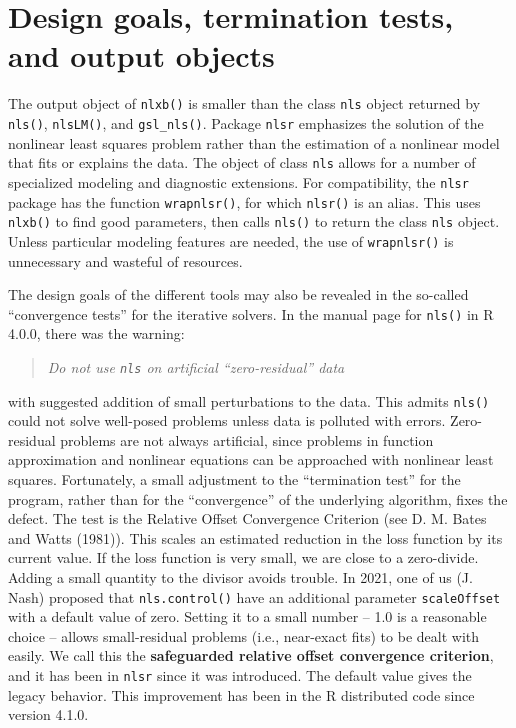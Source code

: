 \hypertarget{design-goals-termination-tests-and-output-objects}{%
\section{Design goals, termination tests, and output objects}\label{design-goals-termination-tests-and-output-objects}}

The output object of \texttt{nlxb()} is smaller than the class \texttt{nls} object returned
by \texttt{nls()}, \texttt{nlsLM()}, and \texttt{gsl\_nls()}. Package \texttt{nlsr} emphasizes the solution
of the nonlinear least squares problem rather than the estimation of a nonlinear
model that fits or explains the data. The object of class \texttt{nls} allows for
a number of specialized modeling and diagnostic extensions. For compatibility,
the \texttt{nlsr} package has the function \texttt{wrapnlsr()}, for which \texttt{nlsr()} is an alias.
This uses \texttt{nlxb()} to find good parameters, then calls \texttt{nls()} to return the class
\texttt{nls} object. Unless particular modeling features are needed, the use of
\texttt{wrapnlsr()} is unnecessary and wasteful of resources.

The design goals of the different tools may also be revealed in the so-called
``convergence tests'' for the iterative solvers. In the manual page for \texttt{nls()}
in R 4.0.0, there was the warning:

\begin{quote}
\emph{Do not use \texttt{nls} on artificial ``zero-residual'' data}
\end{quote}

with suggested addition of small perturbations to the data. This admits
\texttt{nls()} could not solve well-posed problems unless data is polluted
with errors. Zero-residual problems are not always artificial,
since problems in function approximation and nonlinear equations can be
approached with nonlinear least squares. Fortunately, a small adjustment
to the ``termination test'' for the program, rather than for the
``convergence'' of the underlying algorithm, fixes the defect. The test
is the Relative Offset Convergence
Criterion (see D. M. Bates and Watts (1981)). This scales an estimated reduction in the loss
function by its current value. If the loss function is very small, we are close
to a zero-divide. Adding a small quantity to the divisor avoids trouble.
In 2021, one of us (J. Nash) proposed that \texttt{nls.control()} have an
additional parameter \texttt{scaleOffset} with a default value of zero. Setting it to a
small number -- 1.0 is a reasonable choice -- allows small-residual problems
(i.e., near-exact fits) to be dealt with easily. We call this the
\textbf{safeguarded relative offset convergence criterion}, and it has been in \texttt{nlsr}
since it was introduced. The default value
gives the legacy behavior. This improvement has been in the R distributed code
since version 4.1.0.

